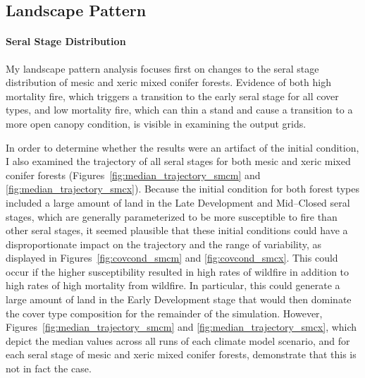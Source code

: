 \subsection*{Landscape Pattern}

\paragraph*{Seral Stage Distribution}
My landscape pattern analysis focuses first on changes to the seral stage distribution of mesic and xeric mixed conifer forests. Evidence of both high mortality fire, which triggers a transition to the early seral stage for all cover types, and low mortality fire, which can thin a stand and cause a transition to a more open canopy condition, is visible in examining the output grids.

In order to determine whether the results were an artifact of the initial condition, I also examined the trajectory of all seral stages for both mesic and xeric mixed conifer forests (Figures~\ref{fig:median_trajectory_smcm} and \ref{fig:median_trajectory_smcx}). Because the initial condition for both forest types included a large amount of land in the Late Development and Mid--Closed seral stages, which are generally parameterized to be more susceptible to fire than other seral stages, it seemed plausible that these initial conditions could have a disproportionate impact on the trajectory and the range of variability, as displayed in Figures~\ref{fig:covcond_smcm} and \ref{fig:covcond_smcx}. This could occur if the higher susceptibility resulted in high rates of wildfire in addition to high rates of high mortality from wildfire. In particular, this could generate a large amount of land in the Early Development stage that would then dominate the cover type composition for the remainder of the simulation. However, Figures~\ref{fig:median_trajectory_smcm} and \ref{fig:median_trajectory_smcx}, which depict the median values across all runs of each climate model scenario, and for each seral stage of mesic and xeric mixed conifer forests, demonstrate that this is not in fact the case. 

